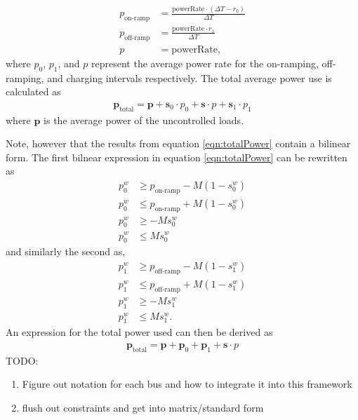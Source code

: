 \begin{align}
	p_{\text{on-ramp}} &= \frac{\text{powerRate}\cdot (\Delta T - r_0)}{\Delta T}\\
	p_{\text{off-ramp}} &= \frac{\text{powerRate}\cdot r_1}{\Delta T}\\
	p &= \text{powerRate},
\end{align}
where $p_0$, $p_1$, and $p$ represent the average power rate for the on-ramping, off-ramping, and charging intervals respectively.
The total average power use is calculated as 
\begin{align}\label{eqn:totalPower}
	\mathbf{p}_{\text{total}} = \mathbf{p} + \mathbf{s}_0\cdot p_0 + \mathbf{s}\cdot p + \mathbf{s}_1\cdot p_1
\end{align}
where $\mathbf{p}$ is the average power of the uncontrolled loads.
\par Note, however that the results from equation \ref{eqn:totalPower} contain a bilinear form. The first bilnear expression in  equation \ref{eqn:totalPower} can be rewritten as 
\begin{equation}
	\begin{aligned}
		p_0^w &\ge p_{\text{on-ramp}} - M(1 - s_0^w) \\
		p_0^w &\le p_{\text{on-ramp}} + M(1 - s_0^w) \\
		p_0^w &\ge -Ms_0^w \\
		p_0^w &\le Ms_0^w
	\end{aligned}
\end{equation}
and similarly the second as, 
\begin{equation}
	\begin{aligned}
		p_1^w &\ge p_{\text{off-ramp}} - M(1 - s_1^w) \\
		p_1^w &\le p_{\text{off-ramp}} + M(1 - s_1^w) \\
		p_1^w &\ge -Ms_1^w \\
		p_1^w &\le Ms_1^w.
	\end{aligned}
\end{equation}
An expression for the total power used can then be derived as
\begin{equation}
	\begin{aligned}
		\mathbf{p}_{\text{total}} = \mathbf{p} + \mathbf{p}_0 + \mathbf{p}_1 + \mathbf{s}\cdot p
	\end{aligned}
\end{equation}
TODO: 
\begin{enumerate}
	\item Figure out notation for each bus and how to integrate it into this framework
	\item flush out constraints and get into matrix/standard form
\end{enumerate}
